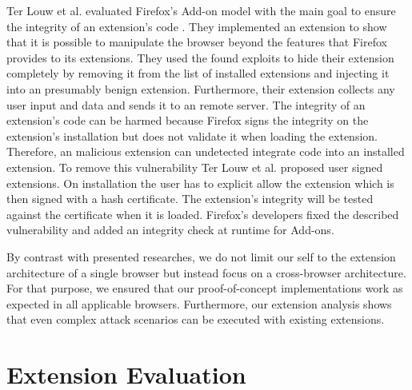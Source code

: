 	Ter Louw et al. evaluated Firefox's Add-on model with the main goal to ensure the integrity of an extension's code \cite{TerLouw:2007:EWB:1420581.1420583}. They implemented an extension to show that it is possible to manipulate the browser beyond the features that Firefox provides to its extensions. They used the found exploits to hide their extension completely by removing it from the list of installed extensions and injecting it into an presumably benign extension. Furthermore, their extension collects any user input and data and sends it to an remote server. The integrity of an extension's code can be harmed because Firefox signs the integrity on the extension's installation but does not validate it when loading the extension. Therefore, an malicious extension can undetected integrate code into an installed extension. To remove this vulnerability Ter Louw et al. proposed user signed extensions. On installation the user has to explicit allow the extension which is then signed with a hash certificate. The extension's integrity will be tested against the certificate when it is loaded. Firefox's developers fixed the described vulnerability and added an integrity check at runtime for Add-ons. %

	By contrast with presented researches, we do not limit our self to the extension architecture of a single browser but instead focus on a cross-browser architecture. For that purpose, we ensured that our proof-of-concept implementations work as expected in all applicable browsers. Furthermore, our extension analysis shows that even complex attack scenarios can be executed with existing extensions.
	
\section{Extension Evaluation} 
	
